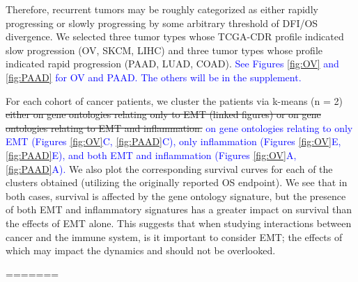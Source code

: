 \documentclass[11pt]{article}
\newcommand{\tcb} { \textcolor{blue} }
\begin{document}
Therefore, recurrent tumors may be roughly categorized as either rapidly progressing or slowly progressing by some arbitrary threshold of DFI/OS divergence.
We selected three tumor types whose TCGA-CDR profile indicated slow progression (OV, SKCM, LIHC) and three tumor types whose profile indicated rapid progression (PAAD, LUAD, COAD).
\tcb{See Figures \ref{fig:OV} and \ref{fig:PAAD} for OV and PAAD. The others will be in the supplement.}
\par
For each cohort of cancer patients, we cluster the patients via k-means (n = 2) \sout{either on gene ontologies relating only to EMT (linked figures) or on gene ontologies relating to EMT and inflammation.} \tcb{on gene ontologies relating to only EMT (Figures \ref{fig:OV}C, \ref{fig:PAAD}C), only inflammation (Figures \ref{fig:OV}E, \ref{fig:PAAD}E), and both EMT and inflammation (Figures \ref{fig:OV}A, \ref{fig:PAAD}A).}
We also plot the corresponding survival curves for each of the clusters obtained (utilizing the originally reported OS endpoint).
We see that in both cases, survival is affected by the gene ontology signature, but the presence of both EMT and inflammatory signatures has a greater impact on survival than the effects of EMT alone.
This suggests that when studying interactions between cancer and the immune system, is it important to consider EMT; the effects of which may impact the dynamics and should not be overlooked. 

\par
=======
\end{document}
